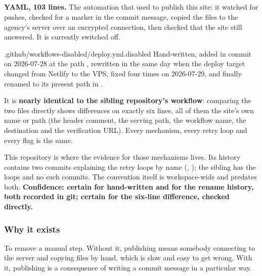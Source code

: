 \subsection{}

\textbf{YAML, 103 lines.} The automation that used to publish this site: it watched
for pushes, checked for a marker in the commit message, copied the files to the
agency's server over an encrypted connection, then checked that the site still
answered. It is currently switched off.

\begin{provenance}{.github/workflows-disabled/deploy.yml.disabled}
Hand-written, added in commit  on 2026-07-28 at the path
, rewritten in  the same day when
the deploy target changed from Netlify to the VPS, fixed four times on 2026-07-29,
and finally renamed to its present path in .

It is \textbf{nearly identical to the sibling repository's workflow}: comparing the
two files directly shows differences on exactly six lines, all of them the site's
own name or path (the header comment, the serving path, the workflow name, the
 destination and the verification URL). Every mechanism, every retry
loop and every flag is the same.

This repository is where the evidence for those mechanisms lives. Its history
contains two commits explaining the retry loops by name (,
); the sibling has the loops and no such commits. The
\code{[deploy]} convention itself is workspace-wide and predates both.
\textbf{Confidence: certain for hand-written and for the rename history, both
recorded in git; certain for the six-line difference, checked directly.}
\end{provenance}

\subsubsection*{Why it exists}

To remove a manual step. Without it, publishing means somebody connecting to the
server and copying files by hand, which is slow and easy to get wrong. With it,
publishing is a consequence of writing a commit message in a particular way.

